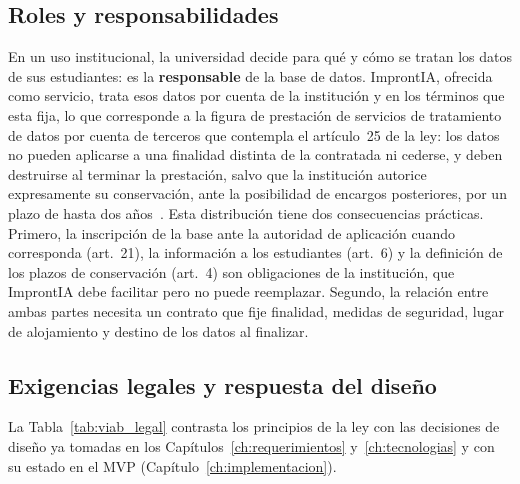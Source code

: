 \subsection{Roles y responsabilidades}

En un uso institucional, la universidad decide para qué y cómo se tratan los datos de sus estudiantes: es la \textbf{responsable} de la base de datos. ImprontIA, ofrecida como servicio, trata esos datos por cuenta de la institución y en los términos que esta fija, lo que corresponde a la figura de prestación de servicios de tratamiento de datos por cuenta de terceros que contempla el artículo~25 de la ley: los datos no pueden aplicarse a una finalidad distinta de la contratada ni cederse, y deben destruirse al terminar la prestación, salvo que la institución autorice expresamente su conservación, ante la posibilidad de encargos posteriores, por un plazo de hasta dos años~\parencite{Argentina2000Ley25326}. Esta distribución tiene dos consecuencias prácticas. Primero, la inscripción de la base ante la autoridad de aplicación cuando corresponda (art.~21), la información a los estudiantes (art.~6) y la definición de los plazos de conservación (art.~4) son obligaciones de la institución, que ImprontIA debe facilitar pero no puede reemplazar. Segundo, la relación entre ambas partes necesita un contrato que fije finalidad, medidas de seguridad, lugar de alojamiento y destino de los datos al finalizar.

\subsection{Exigencias legales y respuesta del diseño}

La Tabla~\ref{tab:viab_legal} contrasta los principios de la ley con las decisiones de diseño ya tomadas en los Capítulos~\ref{ch:requerimientos} y~\ref{ch:tecnologias} y con su estado en el MVP (Capítulo~\ref{ch:implementacion}).

